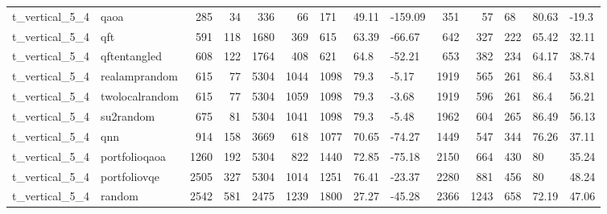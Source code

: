\begin{longtable}{llrrrrlllrrlll}
t\_vertical\_5\_4 & qaoa & 285 & 34 & 336 & 66 & 171 & 49.11 & -159.09 & 351 & 57 & 68 & 80.63 & -19.3 \\
t\_vertical\_5\_4 & qft & 591 & 118 & 1680 & 369 & 615 & 63.39 & -66.67 & 642 & 327 & 222 & 65.42 & 32.11 \\
t\_vertical\_5\_4 & qftentangled & 608 & 122 & 1764 & 408 & 621 & 64.8 & -52.21 & 653 & 382 & 234 & 64.17 & 38.74 \\
t\_vertical\_5\_4 & realamprandom & 615 & 77 & 5304 & 1044 & 1098 & 79.3 & -5.17 & 1919 & 565 & 261 & 86.4 & 53.81 \\
t\_vertical\_5\_4 & twolocalrandom & 615 & 77 & 5304 & 1059 & 1098 & 79.3 & -3.68 & 1919 & 596 & 261 & 86.4 & 56.21 \\
t\_vertical\_5\_4 & su2random & 675 & 81 & 5304 & 1041 & 1098 & 79.3 & -5.48 & 1962 & 604 & 265 & 86.49 & 56.13 \\
t\_vertical\_5\_4 & qnn & 914 & 158 & 3669 & 618 & 1077 & 70.65 & -74.27 & 1449 & 547 & 344 & 76.26 & 37.11 \\
t\_vertical\_5\_4 & portfolioqaoa & 1260 & 192 & 5304 & 822 & 1440 & 72.85 & -75.18 & 2150 & 664 & 430 & 80 & 35.24 \\
t\_vertical\_5\_4 & portfoliovqe & 2505 & 327 & 5304 & 1014 & 1251 & 76.41 & -23.37 & 2280 & 881 & 456 & 80 & 48.24 \\
t\_vertical\_5\_4 & random & 2542 & 581 & 2475 & 1239 & 1800 & 27.27 & -45.28 & 2366 & 1243 & 658 & 72.19 & 47.06 \\
\end{longtable}
